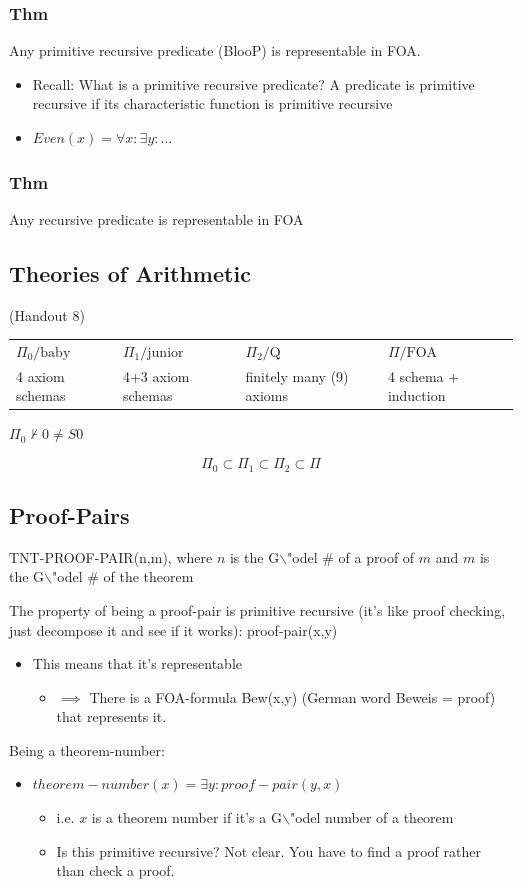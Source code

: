\documentclass[11pt]{article}
\begin{document}
\subsubsection{Thm}
\label{sec:org32d2f4e}
Any primitive recursive predicate (BlooP) is representable in FOA.
\begin{itemize}
\item Recall: What is a primitive recursive predicate? A predicate is primitive recursive if its characteristic function is primitive recursive
\item \(Even(x) = \forall x : \exists y : \ldots\)
\end{itemize}
\subsubsection{Thm}
\label{sec:org932f74a}
Any recursive predicate is representable in FOA
\subsection{Theories of Arithmetic}
\label{sec:org835aec0}
(Handout 8)
\begin{center}
\begin{tabular}{llll}
\(\Pi_0\text{/baby}\) & \(\Pi_1\text{/junior}\) & \(\Pi_2\text{/Q}\) & \(\Pi\text{/FOA}\)\\
4 axiom schemas & 4+3 axiom schemas & finitely many (9) axioms & 4 schema + induction\\
\end{tabular}
\end{center}
\(\Pi_0 \nvdash 0 \neq S0\)

$$\Pi_0 \subset \Pi_1 \subset \Pi_2 \subset \Pi $$
\subsection{Proof-Pairs}
\label{sec:org5f0333d}
TNT-PROOF-PAIR(n,m), where \(n\) is the G$\backslash$"odel \# of a proof of \(m\) and \(m\) is the G$\backslash$"odel \# of the theorem

The property of being a proof-pair is primitive recursive (it's like proof checking, just decompose it and see if it works): proof-pair(x,y)
\begin{itemize}
\item This means that it's representable
\begin{itemize}
\item \(\implies\) There is a FOA-formula Bew(x,y) (German word Beweis = proof) that represents it.
\end{itemize}
\end{itemize}
Being a theorem-number:
\begin{itemize}
\item \(theorem-number(x) = \exists y:proof-pair(y,x)\)
\begin{itemize}
\item i.e. \(x\) is a theorem number if it's a G$\backslash$"odel number of a theorem
\item Is this primitive recursive? Not clear. You have to find a proof rather than check a proof.
\end{itemize}
\end{itemize}
\end{document}
